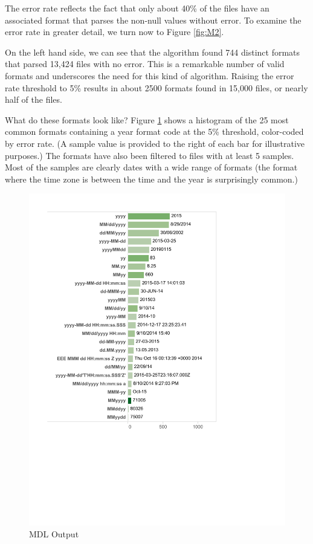 The error rate reflects the fact that only about 40\% of the files have an associated format that parses the non-null values without error. To examine the error rate in greater detail, we turn now to Figure \ref{fig:M2}.

On the left hand side, we can see that the algorithm found 744 distinct formats that parsed 13,424 files with no error. This is a remarkable number of valid formats and underscores the need for this kind of algorithm. Raising the error rate threshold to 5\% results in about 2500 formats found in 15,000 files, or nearly half of the files. 

What do these formats look like? Figure \ref{fig:M3} shows a histogram of the 25 most common formats containing a year format code at the 5\% threshold, color-coded by error rate. (A sample value is provided to the right of each bar for illustrative purposes.) The formats have also been filtered to files with at least 5 samples. Most of the samples are clearly dates with a wide range of formats (the format where the time zone is between the time and the year is surprisingly common.)
 
\begin{figure}[ht]
\centering
\includegraphics[width=\columnwidth]{figures/FigureM3}
\caption{MDL Output}
\label{fig:M3}
\end{figure}


